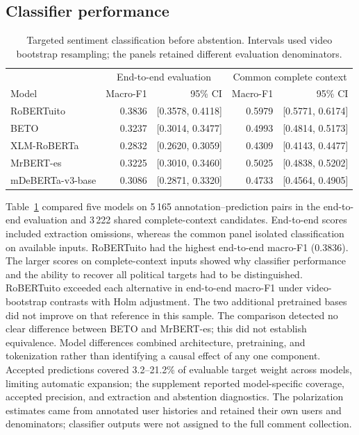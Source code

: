 \documentclass[conference,letterpaper]{IEEEtran}
\begin{document}
\subsection{Classifier performance}
\begin{table}[t]\centering\small
\caption{Targeted sentiment classification before abstention. Intervals used video bootstrap resampling; the panels retained different evaluation denominators.}
\label{tab:clasificadores}
\begin{tabular}{lrrrr}\toprule
& \multicolumn{2}{c}{End-to-end evaluation} & \multicolumn{2}{c}{Common complete context}\\
Model & Macro-F1 & 95\% CI & Macro-F1 & 95\% CI\\\midrule
RoBERTuito & 0.3836 & [0.3578, 0.4118] & 0.5979 & [0.5771, 0.6174]\\
BETO & 0.3237 & [0.3014, 0.3477] & 0.4993 & [0.4814, 0.5173]\\
XLM-RoBERTa & 0.2832 & [0.2620, 0.3059] & 0.4309 & [0.4143, 0.4477]\\
MrBERT-es & 0.3225 & [0.3010, 0.3460] & 0.5025 & [0.4838, 0.5202]\\
mDeBERTa-v3-base & 0.3086 & [0.2871, 0.3320] & 0.4733 & [0.4564, 0.4905]\\
\bottomrule\end{tabular}\end{table}

Table~\ref{tab:clasificadores} compared five models on 5\,165 annotation--prediction pairs in the end-to-end evaluation and 3\,222 shared complete-context candidates. End-to-end scores included extraction omissions, whereas the common panel isolated classification on available inputs. RoBERTuito had the highest end-to-end macro-F1 (0.3836). The larger scores on complete-context inputs showed why classifier performance and the ability to recover all political targets had to be distinguished.
RoBERTuito exceeded each alternative in end-to-end macro-F1 under video-bootstrap contrasts with Holm adjustment. The two additional pretrained bases did not improve on that reference in this sample.
The comparison detected no clear difference between BETO and MrBERT-es; this did not establish equivalence. Model differences combined architecture, pretraining, and tokenization rather than identifying a causal effect of any one component.
Accepted predictions covered 3.2--21.2\% of evaluable target weight across models, limiting automatic expansion; the supplement reported model-specific coverage, accepted precision, and extraction and abstention diagnostics. The polarization estimates came from annotated user histories and retained their own users and denominators; classifier outputs were not assigned to the full comment collection.
\end{document}
